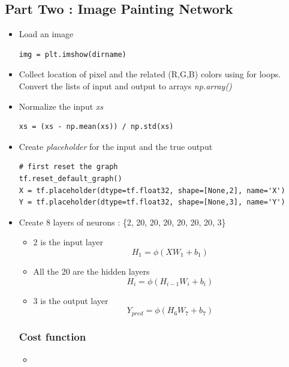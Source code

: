 \documentclass[12pt,a4paper]{article}
\begin{document}
\subsection{Part Two : Image Painting Network}
\begin{itemize}
\item Load an image
\begin{lstlisting}
img = plt.imshow(dirname)
\end{lstlisting}
\item Collect location of pixel and the related (R,G,B) colors using for loops. Convert the lists of input and output to arrays \textit{np.array()}
\item Normalize the input \textit{xs}
\begin{lstlisting}
xs = (xs - np.mean(xs)) / np.std(xs)
\end{lstlisting}
\item Create \textit{placeholder} for the input and the true output
\begin{lstlisting}
# first reset the graph
tf.reset_default_graph()
X = tf.placeholder(dtype=tf.float32, shape=[None,2], name='X')
Y = tf.placeholder(dtype=tf.float32, shape=[None,3], name='Y')
\end{lstlisting}
\item Create 8 layers of neurons : \{2, 20, 20, 20, 20, 20, 20, 3\}
\begin{itemize}
\item 2 is the input layer
\begin{equation}
H_1 = \phi(XW_1 + b_1)
\end{equation}
\item All the 20 are the hidden layers
\begin{equation}
H_{i} = \phi(H_{i-1}W_i + b_i)
\end{equation}
\item 3 is the output layer
\begin{equation}
Y_{pred} = \phi(H_6W_7 + b_7)
\end{equation}
\end{itemize}
\subsubsection{Cost function}
\begin{itemize}
\item 
\end{itemize}
\end{itemize}
\end{document}
